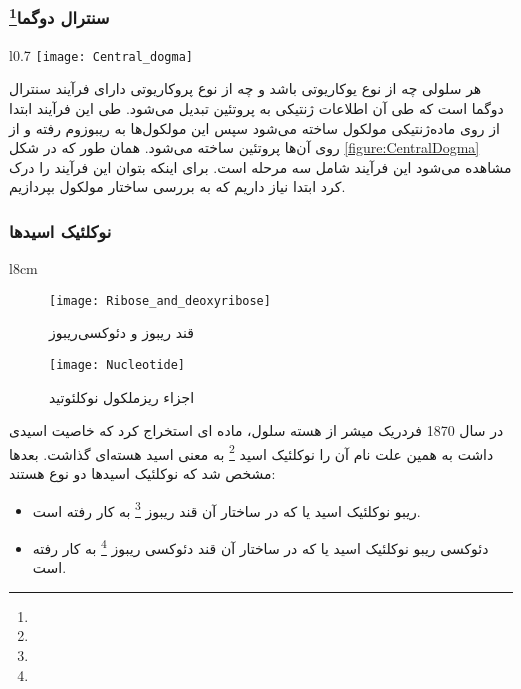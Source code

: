 \subsubsection{سنترال دوگما\protect\footnote{}}

\begin{wrapfigure}[13]{l}{0.7\textwidth}
	\centering
	\texttt{[image: Central\_dogma]}
	\caption{فرايند مضاعف کردن، رونویسی و ترجمه}
	\label{figure:CentralDogma}
\end{wrapfigure}

هر سلولی چه از نوع یوکاریوتی باشد و چه از نوع پروکاریوتی دارای فرآیند سنترال دوگما است که طی آن اطلاعات ژنتیکی به پروتئین تبدیل می‌شود.
طی این فرآیند ابتدا از روی ماده‌ژنتیکی مولکول
ساخته می‌شود سپس این مولکول‌ها به ریبوزوم رفته و از روی آن‌ها پروتئین ساخته می‌شود.
همان طور که در شکل
\ref{figure:CentralDogma}
مشاهده می‌شود این فرآیند شامل سه مرحله است.
برای اینکه بتوان این فرآیند را درک کرد ابتدا نیاز داریم که به بررسی ساختار مولکول
بپردازیم.
\pagebreak

\subsubsection{نوکلئیک اسید‌ها}

\begin{wrapfigure}{l}{8cm}
	\centering
	
	\begin{subfigure}[b]{8cm}
		\centering
		\texttt{[image: Ribose\_and\_deoxyribose]}
		\caption{قند ریبوز و دئوکسی‌ریبوز}	
	\end{subfigure}
	\begin{subfigure}[b]{8cm}
		\centering
		\texttt{[image: Nucleotide]}
		\caption{اجزاء ریزملکول نوکلئوتید}
		\label{figure:Nucleotide}
	\end{subfigure}
	
\end{wrapfigure}

در سال 1870 فردریک میشر از هسته سلول، ماده ای استخراج کرد که خاصیت اسیدی داشت به همین علت نام آن را نوکلئیک اسید
\footnote{}
به معنی اسید هسته‌ای گذاشت. بعد‌ها مشخص شد که نوکلئیک اسید‌ها دو نوع هستند:
\begin{itemize}
\item ریبو نوکلئیک اسید یا 
که در ساختار آن قند ریبوز
\footnote{}
 به کار رفته است.
\item دئوکسی ریبو نوکلئیک اسید یا
که در ساختار آن قند دئوکسی ریبوز
\footnote{}
 به کار رفته است.
\end{itemize}

